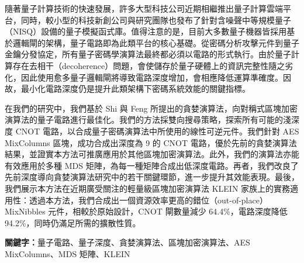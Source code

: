 隨著量子計算技術的快速發展，許多大型科技公司近期相繼推出量子計算雲端平台，同時，較小型的科技新創公司與研究團隊也發布了針對含噪聲中等規模量子（NISQ）設備的量子模擬函式庫。值得注意的是，目前大多數量子機器皆採用基於邏輯閘的架構，量子電路即為此類平台的核心基礎。從密碼分析攻擊元件到量子金鑰分發協定，所有量子密碼學演算法最終都必須以電路的形式執行。由於量子計算存在去相干（decoherence）問題，會使儲存於量子硬體上的資訊完整性隨之劣化，因此使用愈多量子邏輯閘將導致電路深度增加，會相應降低運算準確度。因故，最小化電路深度仍是提升此類架構下密碼系統效能的關鍵指標。

在我們的研究中，我們基於 Shi 與 Feng 所提出的貪婪演算法，向對稱式區塊加密演算法的量子電路進行最佳化。我們的方法採雙向搜尋策略，探索所有可能的淺深度 CNOT 電路，以合成量子密碼演算法中所使用的線性可逆元件。我們針對 AES MixColumns 區塊，成功合成出深度為 9 的 CNOT 電路，優於先前的貪婪演算法結果，並證實本方法可推廣應用於其他區塊加密演算法。此外，我們的演算法亦能有效應用於多種 MDS 矩陣，為每一種矩陣合成出低深度電路。再者，我們改良了先前深度導向貪婪演算法研究中的若干關鍵環節，進一步提升其效能表現。最後，我們展示本方法在近期廣受關注的輕量級區塊加密演算法 KLEIN 家族上的實務適用性：透過本方法，我們合成出一個資源效率更高的錯位（out-of-place）MixNibbles 元件，相較於原始設計，CNOT 閘數量減少 64.4\%，電路深度降低 94.2\%，同時仍滿足所需的擴散性質。

\medskip
\textbf{關鍵字：}量⼦電路、量⼦深度、貪婪演算法、區塊加密演算法、AES MixColumns、MDS 矩陣、KLEIN